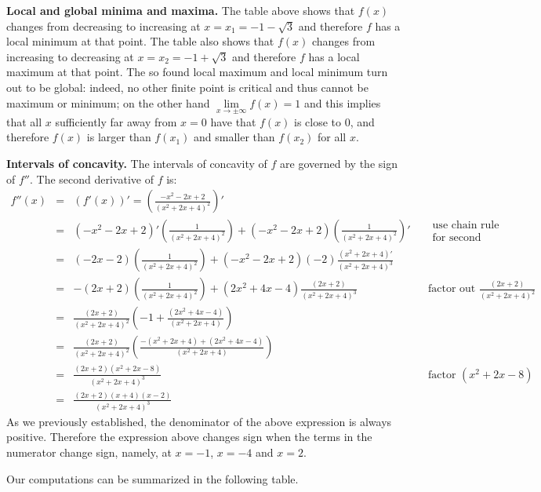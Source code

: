 {\textbf{Local and global minima and maxima. } The table above shows that $f(x)$ changes from decreasing to increasing at $x=x_1=-1-\sqrt{3}$ and therefore $f$ has a local minimum at that point. The table also shows that $f(x)$ changes from increasing to decreasing at $ x=x_2=-1+\sqrt{3}$ and therefore $f$ has a local maximum at that point. The so found local maximum and local minimum turn out to be global: indeed, no other finite point is critical and thus cannot be maximum or minimum; on the other hand $\lim\limits_{x\to\pm \infty}f(x)=1$ and this implies that all $x$ sufficiently far away from $x=0$ have that $f(x)$ is close to $0$, and therefore $f(x)$ is larger than $f(x_1)$ and smaller than $f(x_2)$ for all $x$.

\textbf{Intervals of concavity. } 
The intervals of concavity of $f$ are governed by the sign of $f''$. The second derivative of $f$ is:
\[
\begin{array}{rcll|l}
f''(x)&=&\displaystyle (f'(x))'= \left(\frac{-x^2-2x+2}{\left(x^2+2x+4 \right)^2}\right)'\\
&=&\displaystyle (-x^2-2x+2)'\left(\frac{1}{(x^2+2x+4)^2}\right)+(-x^2-2x+2)\left(\frac{1}{(x^2+2x+4)^2}\right)' &&\begin{array}{l}\text{use chain rule }\\\text{for second differentiation}\end{array}\\
&=&\displaystyle (-2x-2)\left(\frac{1}{(x^2+2x+4)^2}\right)+(-x^2-2x+2)(-2)\frac{(x^2+2x+4)'}{(x^2+2x+4)^{3}}\\
&=&\displaystyle -(2x+2)\left(\frac{1}{(x^2+2x+4)^2}\right) +(2x^2+4x-4)\frac{(2x+2)}{(x^2+2x+4)^{3}}&&\text{factor out }\frac{(2x+2)}{(x^2+2x+4)^2}\\
&=&\displaystyle \frac{(2x+2)}{(x^2+2x+4)^2}\left(-1+\frac{(2x^2+4x-4)}{(x^2+2x+4)}\right)\\
&=&\displaystyle \frac{(2x+2)}{(x^2+2x+4)^2}\left(\frac{-(x^2+2x+4)+(2x^2+4x-4)}{(x^2+2x+4)} \right)\\
&=&\displaystyle \frac{(2x+2)(x^{2}+2 x-8)}{(x^2+2x+4)^3}&& \text{factor } (x^2+2x-8)\\
&=&\displaystyle \frac{(2x+2)(x+4)(x-2)}{(x^2+2x+4)^3}
\end{array}
\]
As we previously established, the denominator of the above expression is always positive. Therefore the expression above changes sign when the terms in the numerator change sign, namely, at $x=-1$, $x=-4$ and $x=2$. 

Our computations can be summarized in the following table. 

}
